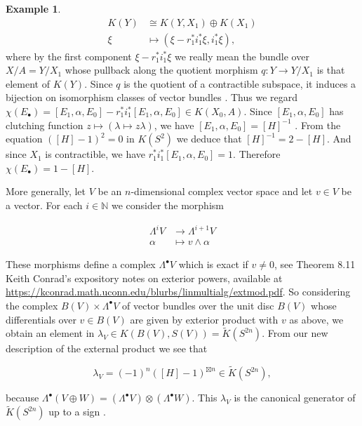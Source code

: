 \documentclass[12pt,a4paper]{amsart}
\theoremstyle{plain}
\theoremstyle{definition}
\newtheorem{exmp}[thm]{Example}
\theoremstyle{remark}
\begin{document}
\begin{exmp}
  \begin{align*}
    K(Y) & \cong K(Y,X_{1}) \oplus K(X_{1}) \\
    \xi & \mapsto (\xi - r_{1}^{*}i_{1}^{*}\xi,i_{1}^{*}\xi),
  \end{align*}
  where by the first component $\xi - r_{1}^{*}i_{1}^{*}\xi$ we really mean the bundle over $X/A = Y/X_{1}$ whose pullback along the quotient morphism $q \colon Y \to Y/X_{1}$ is that element of $K(Y)$.
  Since $q$ is the quotient of a contractible subspace, it induces a bijection on isomorphism classes of vector bundles \cite[Lemma 1.4.8]{ati67}.
  Thus we regard $\chi(E_{\bullet}) = [E_{1}, \alpha, E_{0}] - r_{1}^{*}i_{1}^{*}[E_{1}, \alpha, E_{0}] \in K(X_{0},A)$.
  Since $[E_{1}, \alpha, E_{0}]$ has clutching function $z \mapsto (\lambda \mapsto z\lambda)$, we have $[E_{1}, \alpha, E_{0}] = [H]^{-1}$ \cite[p.~49]{ati67}.
  From the equation $([H] - 1)^{2} = 0$ in $K(S^{2})$ we deduce that $[H]^{-1} = 2 - [H]$.
  And since $X_{1}$ is contractible, we have $r_{1}^{*}i_{1}^{*}[E_{1}, \alpha, E_{0}] = 1$.
  Therefore $\chi(E_{\bullet}) = 1 - [H]$.
\end{exmp}

More generally, let $V$ be an $n$-dimensional complex vector space and let $v \in V$ be a vector.
For each $i \in \mathbb{N}$ we consider the morphism

\begin{align*}
  \Lambda^{i}V & \to \Lambda^{i+1}V \\
  \alpha & \mapsto v \wedge \alpha
\end{align*}

These morphisms define a complex $\Lambda^{\bullet}V$ which is exact if $v \neq 0$, see Theorem 8.11 Keith Conrad's expository notes on exterior powers, available at \url{https://kconrad.math.uconn.edu/blurbs/linmultialg/extmod.pdf}.
So considering the complex $B(V) \times \Lambda^{\bullet}V$ of vector bundles over the unit disc $B(V)$ whose differentials over $v \in B(V)$ are given by exterior product with $v$ as above, we obtain an element in $\lambda_{V} \in K(B(V),S(V)) = \tilde{K}(S^{2n})$.
From our new description of the external product we see that

\[ \lambda_{V} = (-1)^{n}([H]-1)^{\boxtimes n} \in \tilde{K}(S^{2n}), \]

because $\Lambda^{\bullet}(V \oplus W) = (\Lambda^{\bullet}V) \otimes (\Lambda^{\bullet}W)$.
This $\lambda_{V}$ is the canonical generator of $\tilde{K}(S^{2n})$ up to a sign \cite[Corollary 2.12]{hat03}.
\end{document}
